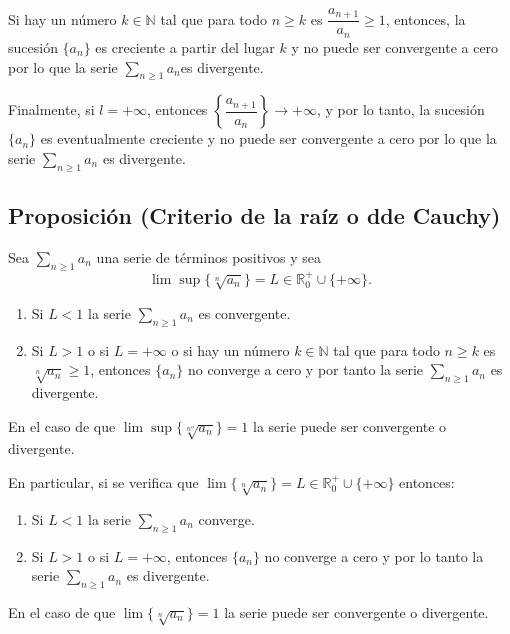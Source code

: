 \documentclass[10pt,a4paper]{article}
\begin{document}
	Si hay un número $k \in \mathbb{N}$ tal que para todo $n \geq k$ es $\dfrac{a_{n+1}}{a_n} \geq 1$, entonces, la sucesión $\{a_n\}$ es creciente a partir del lugar $k$ y no puede ser convergente a cero por lo que la serie $\displaystyle \sum_{n \geq 1} a_n$es divergente.
	
	Finalmente, si $l = + \infty$, entonces $\left\{\dfrac{a_{n+1}}{a_n}\right\} \rightarrow + \infty$, y por lo tanto, la sucesión $\{a_n\}$ es eventualmente creciente y no puede ser convergente a cero por lo que la serie $\displaystyle \sum_{n \geq 1} a_n$ es divergente.
	
	\subsection{Proposición (Criterio de la raíz o dde Cauchy)}
	Sea $\displaystyle \sum_{n \geq 1} a_n$ una serie de términos positivos y sea
	$$\lim \sup \{\sqrt[n]{a_n}\} = L \in \mathbb{R}_0 ^+ \cup \{+ \infty\}.$$

	\begin{enumerate}[label = \alph*)]
		\item Si $L < 1$ la serie $\displaystyle \sum_{n \geq 1} a_n$ es convergente.
		\item Si $L > 1$ o si $L = + \infty$ o si hay un número $k \in \mathbb{N}$ tal que para todo $n \geq k$ es $\sqrt[n]{a_n} \geq 1$, entonces $\{a_n\}$ no converge a cero y por tanto la serie $\displaystyle \sum_{n \geq 1} a_n$ es divergente.
	\end{enumerate}

	En el caso de que $\lim \sup\{\sqrt[nº]{a_n}\} = 1$ la serie puede ser convergente o divergente.
	
	En particular, si se verifica que $\lim\{\sqrt[n]{a_n}\} = L \in \mathbb{R}_0 ^+ \cup \{+ \infty\}$ entonces:
	\begin{enumerate}[label = \alph*)]
		\item Si $L < 1$ la serie $\displaystyle \sum_{n \geq 1} a_n$ converge.
		\item Si $L > 1$ o si $L = + \infty$, entonces $\{a_n\}$ no converge a cero y por lo tanto la serie $\displaystyle \sum_{n \geq 1} a_n$ es divergente.
	\end{enumerate}
	En el caso de que $\lim\{\sqrt[n]{a_n}\} = 1$ la serie puede ser convergente o divergente.
	
\end{document}
